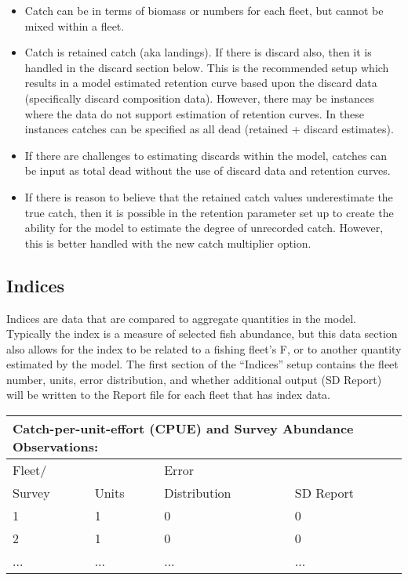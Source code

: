 \begin{itemize}
	\item Catch can be in terms of biomass or numbers for each fleet, but cannot be mixed within a fleet.
	\item Catch is retained catch (aka landings). If there is discard also, then it is handled in the discard section below.  This is the recommended setup which results in a model estimated retention curve based upon the discard data (specifically discard composition data).  However, there may be instances where the data do not support estimation of retention curves.  In these instances catches can be specified as all dead (retained + discard estimates).
	\item If there are challenges to estimating discards within the model, catches can be input as total dead without the use of discard data and retention curves.
	\item If there is reason to believe that the retained catch values underestimate the true catch, then it is possible in the retention parameter set up to create the ability for the model to estimate the degree of unrecorded catch.  However, this is better handled with the new catch multiplier option.
\end{itemize}


\subsection{Indices}
Indices are data that are compared to aggregate quantities in the model.  Typically the index is a measure of selected fish abundance, but this data section also allows for the index to be related to a fishing fleet's F, or to another quantity estimated by the model.  The first section of the ``Indices'' setup contains the fleet number, units, error distribution, and whether additional output (SD Report) will be written to the Report file for each fleet that has index data.

\begin{center}
	\begin{tabular}{p{3cm} p{2cm} p{3cm} p{6cm}}
		\multicolumn{4}{l}{Catch-per-unit-effort (CPUE) and Survey Abundance Observations:}\\
		\hline
		Fleet/ &        & Error      &  \Tstrut\\
		Survey & Units  & Distribution & SD Report \Bstrut\\
		\hline
		1 & 1 & 0 & 0 \Tstrut\\
		2 & 1 & 0 & 0 \\
		... & ... & ... & ... \Bstrut\\
		\hline
	\end{tabular}		
\end{center}


